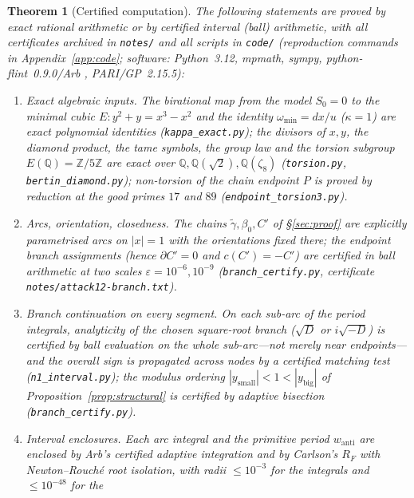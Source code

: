 \documentclass[preprint,12pt]{elsarticle}
\newtheorem{theorem}{Theorem}[section]
\theoremstyle{definition}
\theoremstyle{remark}
\newcommand{\Q}{\mathbb{Q}}
\newcommand{\Z}{\mathbb{Z}}
\begin{document}
\begin{theorem}[Certified computation]\label{thm:cert}
The following statements are proved by exact rational arithmetic or by
certified interval (ball) arithmetic, with all certificates archived in
\texttt{notes/} and all scripts in \texttt{code/}
\textup{(}reproduction commands in Appendix~\ref{app:code};
software: Python~3.12, mpmath, sympy, python-flint~0.9.0/Arb \cite{Arb},
PARI/GP~2.15.5\textup{)}:
\begin{enumerate}
  \item \emph{Exact algebraic inputs.} The birational map from the model
  $S_0=0$ to the minimal cubic $E:y^2+y=x^3-x^2$ and the identity
  $\omega_{\min}=dx/u$ \textup{(}$\kappa=1$\textup{)} are exact polynomial
  identities \textup{(}\texttt{kappa\_exact.py}\textup{)}; the divisors of
  $x,y$, the diamond product, the tame symbols, the group law and the
  torsion subgroup $E(\Q)=\Z/5\Z$ are exact over
  $\Q,\Q(\sqrt2),\Q(\zeta_8)$ \textup{(}\texttt{torsion.py},
  \texttt{bertin\_diamond.py}\textup{)}; non-torsion of the chain endpoint
  $P$ is proved by reduction at the good primes $17$ and $89$
  \textup{(}\texttt{endpoint\_torsion3.py}\textup{)}.
  \item \emph{Arcs, orientation, closedness.} The chains
  $\tilde\gamma,\beta_0,C'$ of \S\ref{sec:proof} are explicitly parametrised
  arcs on $|x|=1$ with the orientations fixed there; the endpoint branch
  assignments \textup{(}hence $\partial C'=0$ and
  $c(C')=-C'$\textup{)} are certified in ball arithmetic at two scales
  $\varepsilon=10^{-6},10^{-9}$ \textup{(}\texttt{branch\_certify.py},
  certificate \texttt{notes/attack12-branch.txt}\textup{)}.
  \item \emph{Branch continuation on every segment.} On each sub-arc of the
  period integrals, analyticity of the chosen square-root branch
  \textup{(}$\sqrt D$ or $i\sqrt{-D}$\textup{)} is certified by ball
  evaluation on the whole sub-arc---not merely near endpoints---and the
  overall sign is propagated across nodes by a certified matching test
  \textup{(}\texttt{n1\_interval.py}\textup{)}; the modulus ordering
  $|y_{\mathrm{small}}|<1<|y_{\mathrm{big}}|$ of
  Proposition~\ref{prop:structural} is certified by adaptive bisection
  \textup{(}\texttt{branch\_certify.py}\textup{)}.
  \item \emph{Interval enclosures.} Each arc integral and the primitive
  period $w_{\mathrm{anti}}$ are enclosed by Arb's certified adaptive
  integration and by Carlson's $R_F$ with Newton--Rouch\'e root isolation,
  with radii $\le10^{-3}$ for the integrals and $\le10^{-48}$ for the

\end{enumerate}
\end{theorem}
\end{document}
